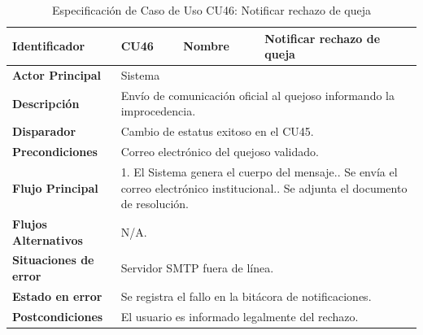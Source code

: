 \begingroup
\setlength{\parskip}{0pt}
\begin{longtable}{|p{3.5cm}|p{2cm}|p{2.5cm}|p{7cm}|}
\caption{Especificación de Caso de Uso CU46: Notificar rechazo de queja}
\label{tab:cu46} \\
\hline
\textbf{Identificador} & CU46 & \textbf{Nombre} & Notificar rechazo de queja \\ \hline
\textbf{Actor Principal} & \multicolumn{3}{p{11.5cm}|}{Sistema} \\ \hline
\textbf{Descripción} & \multicolumn{3}{p{11.5cm}|}{Envío de comunicación oficial al quejoso informando la improcedencia.} \\ \hline
\textbf{Disparador} & \multicolumn{3}{p{11.5cm}|}{Cambio de estatus exitoso en el CU45.} \\ \hline
\textbf{Precondiciones} & \multicolumn{3}{p{11.5cm}|}{Correo electrónico del quejoso validado.} \\ \hline
\textbf{Flujo Principal} & \multicolumn{3}{p{11.5cm}|}{1. El Sistema genera el cuerpo del mensaje.\newline 2. Se envía el correo electrónico institucional.\newline 3. Se adjunta el documento de resolución.} \\ \hline
\textbf{Flujos Alternativos} & \multicolumn{3}{p{11.5cm}|}{N/A.} \\ \hline
\textbf{Situaciones de error} & \multicolumn{3}{p{11.5cm}|}{Servidor SMTP fuera de línea.} \\ \hline
\textbf{Estado en error} & \multicolumn{3}{p{11.5cm}|}{Se registra el fallo en la bitácora de notificaciones.} \\ \hline
\textbf{Postcondiciones} & \multicolumn{3}{p{11.5cm}|}{El usuario es informado legalmente del rechazo.} \\ \hline
\end{longtable}
\endgroup

\vspace{0.8cm}

